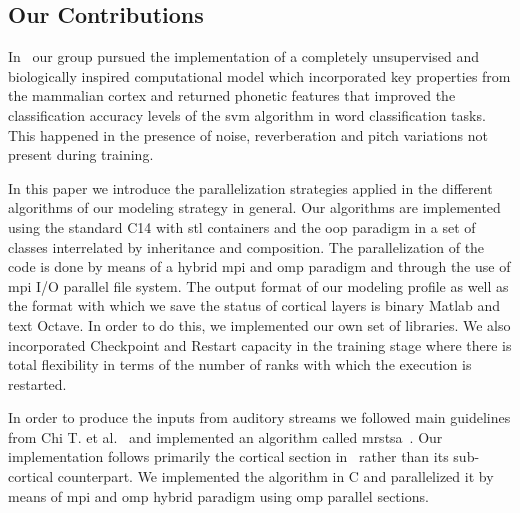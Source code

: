 \documentclass[10pt,journal,compsoc]{IEEEtran}
\newcommand{\CC}{C\nolinebreak\hspace{-.05em}\raisebox{.4ex}{\tiny\bf +}\nolinebreak\hspace{-.10em}\raisebox{.4ex}{\tiny\bf +}}
\begin{document}




\subsection{Our Contributions}


In~\cite{Dematties2018} our group pursued the implementation of a completely unsupervised and biologically inspired computational model which incorporated key properties from the mammalian cortex and returned phonetic features that improved the classification accuracy levels of the \gls{svm} algorithm in word classification tasks. This happened in the presence of noise, reverberation and pitch variations not present during training.

In this paper we introduce the parallelization strategies applied in the different algorithms of our modeling strategy in general. Our algorithms are implemented using the standard \CC14 with \gls{stl} containers and the \gls{oop} paradigm in a set of classes interrelated by inheritance and composition. The parallelization of the code is done by means of a hybrid \gls{mpi} and \gls{omp} paradigm and through the use of \gls{mpi} I/O parallel file system. The output format of our modeling profile as well as the format with which we save the status of cortical layers is binary Matlab and text Octave. In order to do this, we implemented our own set of libraries. We also incorporated Checkpoint and Restart capacity in the training stage where there is total flexibility in terms of the number of ranks with which the execution is restarted.

In order to produce the inputs from auditory streams we followed main guidelines from Chi T. et al.~\cite{chi_2005} and implemented an algorithm called \gls{mrstsa}~\cite{Dematties_2018}. Our implementation follows primarily the cortical section in~\cite{chi_2005} rather than its sub-cortical counterpart. We implemented the algorithm in C and parallelized it by means of \gls{mpi} and \gls{omp} hybrid paradigm using \gls{omp} parallel sections.
\end{document}

